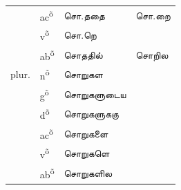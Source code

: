 \documentclass[12pt,a4paper]{scrbook}
\begin{document}
        
\begin{tabular}{llll}
    
          
             &
            ac\textsuperscript{õ} &
            சொ.ததை &
            சொ.றை \\
    
          
    
          
             &
            v\textsuperscript{õ} &
            சொ.றெ \\
    
          
    
          
             &
            ab\textsuperscript{õ} &
            சொததில் &
            சொறில \\
    
          
    
          
            plur. &
            n\textsuperscript{õ} &
            சொறுகள \\
    
          
    
          
             &
            g\textsuperscript{õ} &
            சொறுகளுடைய \\
    
          
    
          
             &
            d\textsuperscript{õ} &
            சொறுகளுககு \\
    
          
    
          
             &
            ac\textsuperscript{õ} &
            சொறுகளை \\
    
          
    
          
             &
            v\textsuperscript{õ} &
            சொறுகளெ \\
    
          
    
          
             &
            ab\textsuperscript{õ} &
            சொறுகளில \\
    
          
    
      
\end{tabular}
    
\end{document}
